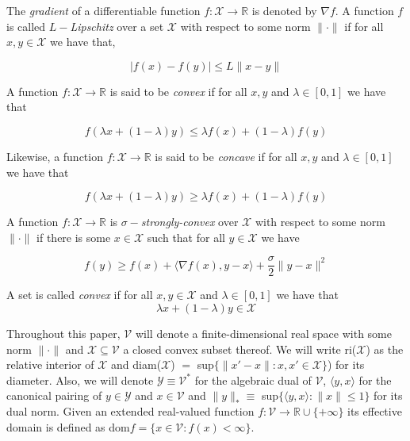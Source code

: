 The \textit{gradient} of a differentiable function $f: \mathcal{X} \to \mathbb{R}$ is denoted by $\nabla f$. A function $f$ is called $L-$\textit{Lipschitz} over a set $\mathcal{X}$ with respect to some norm $\|\cdot\|$ if for all $x,y \in \mathcal{X}$ we have that, 

\begin{equation*}
    |f(x) - f(y)| \le L\|x - y\|
\end{equation*}

A function $f:\mathcal{X} \to \mathbb{R}$ is said to be \textit{convex} if for all $x,y$ and $\lambda \in [0,1]$ we have that 

\begin{equation*}
    f(\lambda x + (1-\lambda)y) \le \lambda f(x) + (1-\lambda)f(y)
\end{equation*}

Likewise, a function $f:\mathcal{X} \to \mathbb{R}$ is said to be \textit{concave} if for all $x,y$ and $\lambda \in [0,1]$ we have that 

\begin{equation*}
    f(\lambda x + (1-\lambda)y) \ge \lambda f(x) + (1-\lambda)f(y)
\end{equation*}

A function $f:\mathcal{X} \to \mathbb{R}$ is $\sigma-$\textit{strongly-convex} over $\mathcal{X}$ with respect to some norm $\|\cdot\|$ if there is some $x \in \mathcal{X}$ such that for all $y \in \mathcal{X}$ we have 

\begin{equation*}
    f(y) \ge f(x) + \langle\nabla f(x),y - x\rangle + \frac{\sigma}{2}\|y - x\|^2
\end{equation*}

A set is called \textit{convex} if for all $x,y \in \mathcal{X}$ and $\lambda \in [0,1]$ we have that 
\begin{equation*}
    \lambda x + (1-\lambda)y \in \mathcal{X} 
\end{equation*}

Throughout this paper, $\mathcal{V}$ will denote a finite-dimensional real space with some norm $\|\cdot\|$ and $\mathcal{X} \subseteq \mathcal{V}$ a closed convex subset thereof. We will write ri($\mathcal{X}$) as the relative interior of $\mathcal{X}$ and diam($\mathcal{X}$) $ = $ sup$\{\|x'-x\|: x,x' \in \mathcal{X}\}$) for its diameter. Also, we will denote $\mathcal{Y} \equiv \mathcal{V}^*$ for the algebraic dual of $\mathcal{V}$, $\langle y,x \rangle$ for the canonical pairing of $y \in \mathcal{Y}$ and $x \in \mathcal{V}$ and $\|y\|_* \equiv $ sup$\{\langle y,x \rangle: \|x\| \le 1\}$ for its dual norm. Given an extended real-valued function $f: \mathcal{V} \to \mathbb{R} \cup \{+\infty\}$ its effective domain is defined as dom$f = \{x \in \mathcal{V} : f(x) < \infty\}$.


